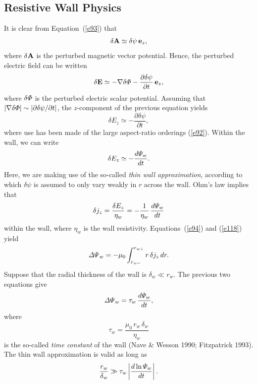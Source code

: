 \documentclass[notitlepage,12pt]{article}
\begin{document}
\subsection{Resistive Wall Physics}\label{tauw}
It is clear from Equation~(\ref{e93}) that
\begin{equation}
\delta {\bf A} \simeq \delta\psi\,{\bf e}_z,
\end{equation}
where $\delta {\bf A}$ is the perturbed magnetic vector potential. 
Hence, the perturbed electric field can be written
\begin{equation}
\delta {\bf E} \simeq -\nabla\delta{\mit\Phi} - \frac{\partial\delta\psi}{\partial t}\,{\bf e}_z,
\end{equation}
where $\delta{\mit\Phi}$ is the perturbed electric scalar potential. 
Assuming that $|\nabla\delta{\mit\Phi}|\sim |\partial\delta\psi/\partial t|$, the $z$-component of the previous
equation yields
\begin{equation}
\delta E_z\simeq -\frac{\partial\delta\psi}{\partial t},
\end{equation}
where use has been made of the large aspect-ratio orderings (\ref{e92}). Within the wall, we
can write
\begin{equation}
\delta E_z \simeq -\frac{d{\mit\Psi}_w}{dt}.
\end{equation}
Here, we are making use of the so-called {\em thin wall approximation}, according to which $\delta\psi$ is assumed to only vary weakly in $r$ across 
the wall. Ohm's law implies that
\begin{equation}
\delta j_z = \frac{\delta E_z}{\eta_w} = -\frac{1}{\eta_w}\,\frac{d{\mit\Psi}_w}{dt}
\end{equation}
within the wall, where $\eta_w$ is the wall resistivity. Equations~(\ref{e94}) and (\ref{e118}) yield
\begin{equation}\label{e132}
{\mit\Delta\Psi}_w = -\mu_0\int_{r_{w-}}^{r_{w+}}r\,\delta j_z\,dr.
\end{equation}
Suppose that the radial thickness of the wall is $\delta_w\ll r_w$. The previous two equations give
\begin{equation}\label{e133}
{\mit\Delta\Psi}_w = \tau_w\,\frac{d{\mit\Psi}_w}{dt},
\end{equation}
where
\begin{equation}
\tau_w = \frac{\mu_0\,r_w\,\delta_w}{\eta_w}
\end{equation}
is the so-called {\em time constant}\/ of the wall (Nave \& Wesson 1990; Fitzpatrick 1993). The thin wall approximation is
valid as long as
\begin{equation}
\frac{r_w}{\delta_w}\gg \tau_w\left|\frac{d\ln{\mit\Psi}_w}{dt}\right|.
\end{equation}
\end{document}
